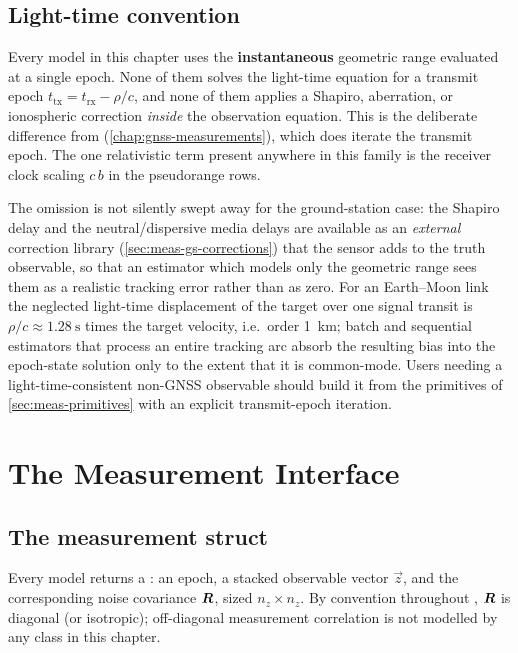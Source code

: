 \subsection{Light-time convention}
\label{sec:meas-lighttime}

\begin{lupntwarning}
  Every model in this chapter uses the \textbf{instantaneous} geometric range
  evaluated at a single epoch. None of them solves the light-time equation for
  a transmit epoch $t_\mathrm{tx} = t_\mathrm{rx} - \rho/c$, and none of them
  applies a Shapiro, aberration, or ionospheric correction \emph{inside} the
  observation equation. This is the deliberate difference from
   (\cref{chap:gnss-measurements}), which does iterate the
  transmit epoch. The one relativistic term present anywhere in this family is
  the receiver clock scaling $c\,b$ in the pseudorange rows.
\end{lupntwarning}

The omission is not silently swept away for the ground-station case: the
Shapiro delay and the neutral/dispersive media delays are available as an
\emph{external} correction library (\cref{sec:meas-gs-corrections}) that the
sensor adds to the truth observable, so that an estimator which models only the
geometric range sees them as a realistic tracking error rather than as zero.
For an Earth--Moon link the neglected light-time displacement of the target
over one signal transit is $\rho/c \approx \SI{1.28}{\second}$ times the target
velocity, i.e.\ order \SI{1}{\kilo\meter}; batch and sequential estimators that
process an entire tracking arc absorb the resulting bias into the
epoch-state solution only to the extent that it is common-mode. Users needing a
light-time-consistent non-GNSS observable should build it from the primitives
of \cref{sec:meas-primitives} with an explicit transmit-epoch iteration.

\section{The Measurement Interface}
\label{sec:meas-interface}

\subsection{The measurement struct}
\label{sec:meas-measdata}

Every model returns a : an epoch, a stacked observable vector
$\vec{z}$, and the corresponding noise covariance $\bm{R}$, sized
$n_z \times n_z$. By convention throughout \lupnt{}, $\bm{R}$ is diagonal (or
isotropic); off-diagonal measurement correlation is not modelled by any class
in this chapter.

